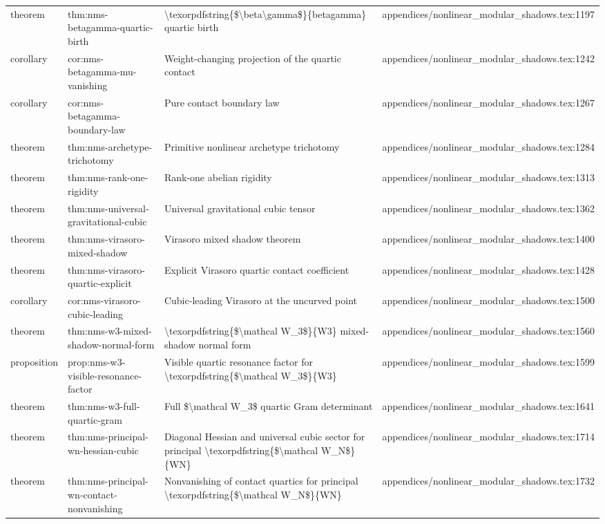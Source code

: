 \documentclass[11pt]{article}
\begin{document}
\begin{longtable}{L{0.10\textwidth}L{0.26\textwidth}L{0.42\textwidth}L{0.22\textwidth}}
theorem & thm:nms-betagamma-quartic-birth & \textbackslash{}texorpdfstring\{\$\textbackslash{}beta\textbackslash{}gamma\$\}\{betagamma\} quartic birth & appendices/nonlinear\_modular\_shadows.tex:1197\\
corollary & cor:nms-betagamma-mu-vanishing & Weight-changing projection of the quartic contact & appendices/nonlinear\_modular\_shadows.tex:1242\\
corollary & cor:nms-betagamma-boundary-law & Pure contact boundary law & appendices/nonlinear\_modular\_shadows.tex:1267\\
theorem & thm:nms-archetype-trichotomy & Primitive nonlinear archetype trichotomy & appendices/nonlinear\_modular\_shadows.tex:1284\\
theorem & thm:nms-rank-one-rigidity & Rank-one abelian rigidity & appendices/nonlinear\_modular\_shadows.tex:1313\\
theorem & thm:nms-universal-gravitational-cubic & Universal gravitational cubic tensor & appendices/nonlinear\_modular\_shadows.tex:1362\\
theorem & thm:nms-virasoro-mixed-shadow & Virasoro mixed shadow theorem & appendices/nonlinear\_modular\_shadows.tex:1400\\
theorem & thm:nms-virasoro-quartic-explicit & Explicit Virasoro quartic contact coefficient & appendices/nonlinear\_modular\_shadows.tex:1428\\
corollary & cor:nms-virasoro-cubic-leading & Cubic-leading Virasoro at the uncurved point & appendices/nonlinear\_modular\_shadows.tex:1500\\
theorem & thm:nms-w3-mixed-shadow-normal-form & \textbackslash{}texorpdfstring\{\$\textbackslash{}mathcal W\_3\$\}\{W3\} mixed-shadow normal form & appendices/nonlinear\_modular\_shadows.tex:1560\\
proposition & prop:nms-w3-visible-resonance-factor & Visible quartic resonance factor for \textbackslash{}texorpdfstring\{\$\textbackslash{}mathcal W\_3\$\}\{W3\} & appendices/nonlinear\_modular\_shadows.tex:1599\\
theorem & thm:nms-w3-full-quartic-gram & Full \$\textbackslash{}mathcal W\_3\$ quartic Gram determinant & appendices/nonlinear\_modular\_shadows.tex:1641\\
theorem & thm:nms-principal-wn-hessian-cubic & Diagonal Hessian and universal cubic sector for principal \textbackslash{}texorpdfstring\{\$\textbackslash{}mathcal W\_N\$\}\{WN\} & appendices/nonlinear\_modular\_shadows.tex:1714\\
theorem & thm:nms-principal-wn-contact-nonvanishing & Nonvanishing of contact quartics for principal \textbackslash{}texorpdfstring\{\$\textbackslash{}mathcal W\_N\$\}\{WN\} & appendices/nonlinear\_modular\_shadows.tex:1732\\

\end{longtable}
\end{document}
